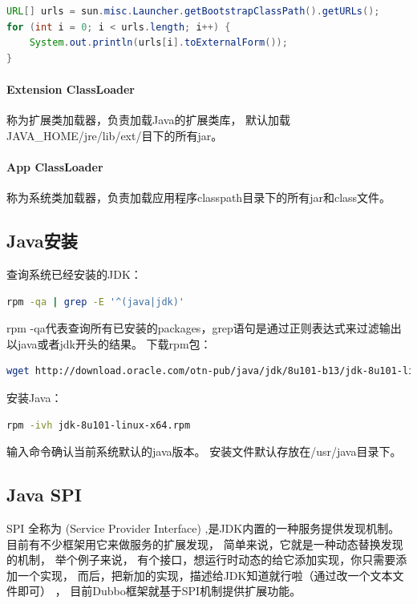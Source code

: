 \documentclass{book}
\begin{document}
\begin{lstlisting}[language=Java]
URL[] urls = sun.misc.Launcher.getBootstrapClassPath().getURLs();
for (int i = 0; i < urls.length; i++) {
	System.out.println(urls[i].toExternalForm());
}
\end{lstlisting}

\paragraph{Extension ClassLoader}

称为扩展类加载器，负责加载Java的扩展类库，
默认加载JAVA\_HOME/jre/lib/ext/目下的所有jar。

\paragraph{App ClassLoader}

称为系统类加载器，负责加载应用程序classpath目录下的所有jar和class文件。

\subsection{Java安装}

查询系统已经安装的JDK：

\begin{lstlisting}[language=Bash]
rpm -qa | grep -E '^(java|jdk)'
\end{lstlisting}

rpm -qa代表查询所有已安装的packages，grep语句是通过正则表达式来过滤输出以java或者jdk开头的结果。
下载rpm包：

\begin{lstlisting}[language=Bash]
wget http://download.oracle.com/otn-pub/java/jdk/8u101-b13/jdk-8u101-linux-x64.rpm?AuthParam=1472693640_91d06a7fe3533c4298b48ccc7e38974f
\end{lstlisting}

安装Java：

\begin{lstlisting}[language=Bash]
rpm -ivh jdk-8u101-linux-x64.rpm
\end{lstlisting}

输入命令确认当前系统默认的java版本。
安装文件默认存放在/usr/java目录下。

\subsection{Java SPI}

SPI 全称为 (Service Provider Interface) ,是JDK内置的一种服务提供发现机制。 
目前有不少框架用它来做服务的扩展发现， 简单来说，它就是一种动态替换发现的机制， 
举个例子来说， 有个接口，想运行时动态的给它添加实现，你只需要添加一个实现，
而后，把新加的实现，描述给JDK知道就行啦（通过改一个文本文件即可） ，
目前Dubbo框架就基于SPI机制提供扩展功能。
\end{document}
